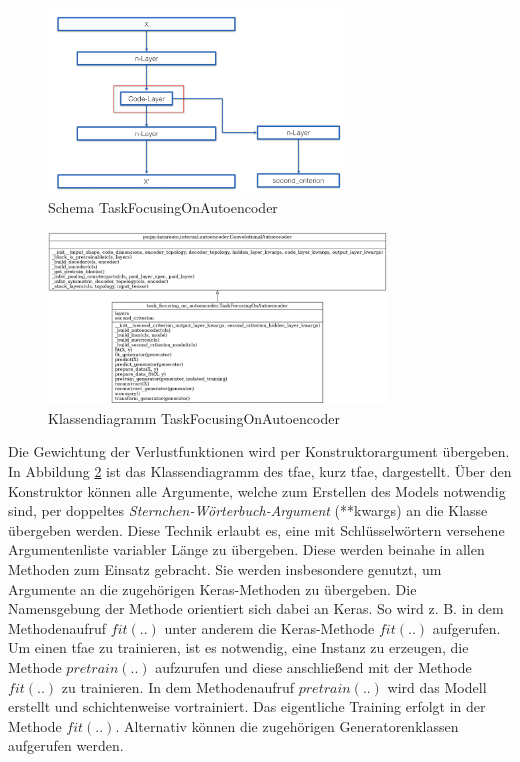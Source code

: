 	\begin{figure}[h]
		\centering
		\includegraphics[width=0.7\textwidth, center]{bilder/Schema_Autoencoders/Schema_SCAE.png}
		\caption[Schema TaskFocusingOnAutoencoder]{Schema TaskFocusingOnAutoencoder}
		\label{img:SchemaTFAE}
	\end{figure}  
	\begin{figure}[h]
		\centering
		\includegraphics[width=0.8\textwidth, center]{bilder/Klassendiagramme/TFAE.png}
		\caption[Klassendiagramm TaskFocusingOnAutoencoder]{Klassendiagramm TaskFocusingOnAutoencoder}
		\label{img:KlassendiagrammTFAE}
	\end{figure}  
	Die Gewichtung der Verlustfunktionen wird per Konstruktorargument übergeben. In Abbildung \ref{img:KlassendiagrammTFAE} ist das Klassendiagramm des \acl{tfae}, kurz \ac{tfae}, dargestellt. \"Uber den Konstruktor können alle Argumente, welche zum Erstellen des Models notwendig sind, per doppeltes \textit{Sternchen-Wörterbuch-Argument} (**kwargs) an die Klasse übergeben werden. Diese Technik erlaubt es, eine mit Schlüsselwörtern versehene Argumentenliste variabler Länge zu übergeben. Diese werden beinahe in allen Methoden zum Einsatz gebracht. Sie werden insbesondere genutzt, um Argumente an die zugehörigen Keras-Methoden zu übergeben. Die Namensgebung der Methode orientiert sich dabei an Keras. So wird z. B. in dem Methodenaufruf $fit(..)$ unter anderem die Keras-Methode $fit(..)$ aufgerufen. Um einen \ac{tfae} zu trainieren, ist es notwendig, eine Instanz zu erzeugen, die Methode $pretrain(..)$ aufzurufen und diese anschließend mit der Methode $fit(..)$ zu trainieren. In dem Methodenaufruf $pretrain(..)$ wird das Modell erstellt und schichtenweise vortrainiert. Das eigentliche Training erfolgt in der Methode $fit(..)$. Alternativ können die zugehörigen Generatorenklassen aufgerufen werden.    

